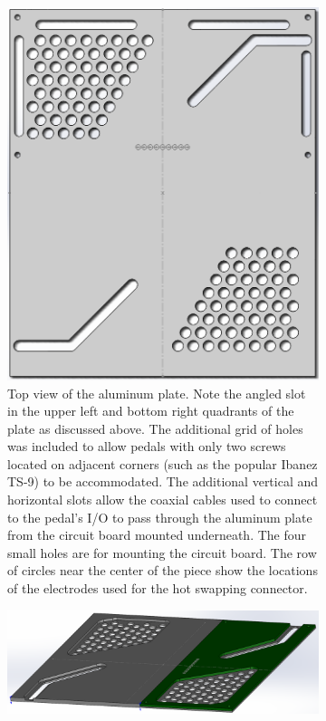 		\begin{figure}
			\centering
			\begin{subfigure}{0.4\textwidth}
				\includegraphics[width = \textwidth]{PR5Images/PlateALTopViewCAD.png}
				\caption{Top view of the aluminum plate.  Note the angled slot in the upper left and bottom right quadrants of the plate as discussed above.  The additional grid of holes was included to allow pedals with only two screws located on adjacent corners (such as the popular Ibanez TS-9) to be accommodated.  The additional vertical and horizontal slots allow the coaxial cables used to connect to the pedal's I/O to pass through the aluminum plate from the circuit board mounted underneath.  The four small holes are for mounting the circuit board.  The row of circles near the center of the piece show the locations of the electrodes used for the hot swapping connector.}
				\label{fig:Plate_AL_top}
			\end{subfigure}
			\begin{subfigure}{0.55\textwidth}
				\includegraphics[width = \textwidth]{PR5Images/PlateAsmCAD.png}

\end{subfigure}
\end{figure}
